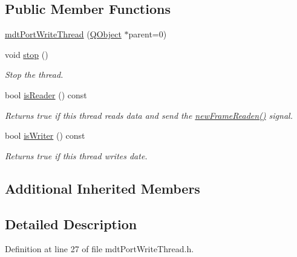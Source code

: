\subsection*{Public Member Functions}
\begin{DoxyCompactItemize}
\item 
\hyperlink{classmdt_port_write_thread_a994b96eafdd721ccff2f2410a5abd5e3}{mdt\-Port\-Write\-Thread} (\hyperlink{class_q_object}{Q\-Object} $\ast$parent=0)
\item 
void \hyperlink{classmdt_port_write_thread_a69702ab3a95c238fb451f866efc7cb34}{stop} ()
\begin{DoxyCompactList}\small\item\em Stop the thread. \end{DoxyCompactList}\item 
bool \hyperlink{classmdt_port_write_thread_ac37bb988773f624def51e841998a2f1e}{is\-Reader} () const 
\begin{DoxyCompactList}\small\item\em Returns true if this thread reads data and send the \hyperlink{classmdt_port_thread_a7fc2245c753fd65e1beffec211c41461}{new\-Frame\-Readen()} signal. \end{DoxyCompactList}\item 
bool \hyperlink{classmdt_port_write_thread_ad2508c3a2433383e2de705e9f3d2e602}{is\-Writer} () const 
\begin{DoxyCompactList}\small\item\em Returns true if this thread writes date. \end{DoxyCompactList}\end{DoxyCompactItemize}
\subsection*{Additional Inherited Members}


\subsection{Detailed Description}


Definition at line 27 of file mdt\-Port\-Write\-Thread.\-h.



